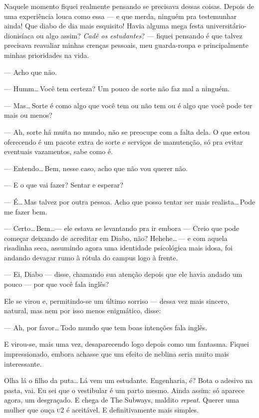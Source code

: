 Naquele momento fiquei realmente pensando se precisava dessas coisas. Depois de uma experiência louca como essa --- e que merda, ninguém pra testemunhar ainda! Que diabo de dia mais esquisito! Havia alguma mega festa u\-ni\-ver\-si\-tá\-ri\-o-dio\-ni\-sí\-a\-ca ou algo assim? \emph{Cadê os estudantes}? --- fiquei pensando é que talvez precisava reavaliar minhas crenças pessoais, meu guarda-roupa e principalmente minhas prioridades na vida.

--- Acho que não.

--- Humm\ldots\,Você tem certeza? Um pouco de sorte não faz mal a ninguém.

--- Mas\ldots\,Sorte é como algo que você tem ou não tem ou é algo que você pode ter mais ou menos?

--- Ah, sorte há muita no mundo, não se preocupe com a falta dela. O que estou oferecendo é um pacote extra de sorte e serviços de manutenção, só pra evitar eventuais vazamentos, sabe como é.

--- Entendo\ldots\,Bem, nesse caso, acho que não vou querer não.

--- E o que vai fazer? Sentar e esperar?

--- É\ldots\,Mas talvez por outra pessoa. Acho que posso tentar ser mais realista\ldots\,Pode me fazer bem.

--- Certo\ldots\,Bem\ldots --- ele estava se levantando pra ir embora --- Creio que pode começar deixando de acreditar em Diabo, não? Hehehe\ldots\,--- e com aquela risadinha seca, as\-su\-min\-do agora uma identidade psicológica mais idosa, foi andando devagar rumo à rótula do campus logo à frente.

--- Ei, Diabo --- disse, chamando sua atenção depois que ele havia andado um pouco --- por que você fala inglês?

Ele se virou e, permitindo-se um último sorriso --- dessa vez mais sincero, natural, mas nem por isso menos enigmático, disse:

--- Ah, por favor\ldots\,Todo mundo que tem boas intenções fala inglês.

E virou-se, mais uma vez, desaparecendo logo depois como um fantasma. Fiquei impressionado, embora achasse que um efeito de neblina seria muito mais interessante.

Olha lá o filho da puta\ldots\,Lá vem um estudante. Engenharia, é? Bota o adesivo na pasta, vai. Eu sei que o vestibular é um parto mesmo. Ainda assim: só aparece agora, um desgraçado. E chega de The Subways, maldito \emph{repeat}. Querer uma mulher que ouça \textsc{u}2 é aceitável. E definitivamente mais simples.
